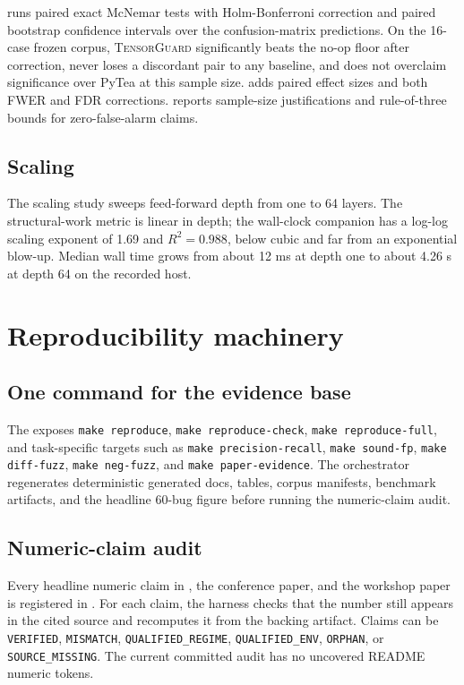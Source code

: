 \documentclass[11pt]{article}
\newcommand{\tg}{\textsc{TensorGuard}}
\begin{document}
 runs paired exact McNemar tests with
Holm-Bonferroni correction and paired bootstrap confidence intervals over the
confusion-matrix predictions.  On the 16-case frozen corpus, \tg{} significantly
beats the no-op floor after correction, never loses a discordant pair to any
baseline, and does not overclaim significance over PyTea at this sample size.
 adds paired effect sizes and both FWER
and FDR corrections.   reports
sample-size justifications and rule-of-three bounds for zero-false-alarm claims.

\subsection{Scaling}

The scaling study sweeps feed-forward depth from one to 64 layers.  The
structural-work metric is linear in depth; the wall-clock companion has a
log-log scaling exponent of 1.69 and $R^2=0.988$, below cubic and far from an
exponential blow-up.  Median wall time grows from about 12 ms at depth one to
about 4.26 s at depth 64 on the recorded host.

\section{Reproducibility machinery}

\subsection{One command for the evidence base}

The  exposes \texttt{make reproduce}, \texttt{make
reproduce-check}, \texttt{make reproduce-full}, and task-specific targets such
as \texttt{make precision-recall}, \texttt{make sound-fp},
\texttt{make diff-fuzz}, \texttt{make neg-fuzz}, and \texttt{make
paper-evidence}.  The orchestrator 
regenerates deterministic generated docs, tables, corpus manifests, benchmark
artifacts, and the headline 60-bug figure before running the numeric-claim
audit.

\subsection{Numeric-claim audit}

Every headline numeric claim in , the conference paper, and the
workshop paper is registered in .
For each claim, the harness checks that the number still appears in the cited
source and recomputes it from the backing artifact.  Claims can be
\texttt{VERIFIED}, \texttt{MISMATCH}, \texttt{QUALIFIED\_REGIME},
\texttt{QUALIFIED\_ENV}, \texttt{ORPHAN}, or \texttt{SOURCE\_MISSING}.  The
current committed audit has no uncovered README numeric tokens.
\end{document}
